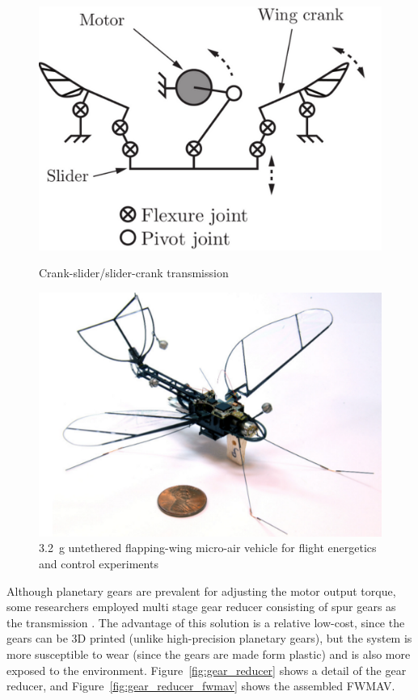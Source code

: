 \begin{figure}
\centering
{}
\includegraphics[width=\textwidth]{Files/Figures/crank-slider.png}
\caption[Crank-slider/slider-crank transmission]{Crank-slider/slider-crank transmission \cite{Rosen2016} }
\label{fig:crank-slider}
\endminipage\hfill
{}
\includegraphics[width=\textwidth]{Files/Figures/locust.png}
\caption[Locust size FWMAV]{3.2~g untethered flapping-wing micro-air vehicle for flight energetics and control experiments \cite{Rosen2016}}
\label{fig:locust}
\endminipage\hfill
\end{figure}

Although planetary gears are prevalent for adjusting the motor output torque, some researchers employed multi stage gear reducer consisting of spur gears as the transmission \cite{Phan2015}. The advantage of this solution is a relative low-cost, since the gears can be 3D printed (unlike high-precision planetary gears), but the system is more susceptible to wear (since the gears are made form plastic) and is also more exposed to the environment. Figure~\ref{fig:gear_reducer} shows a detail of the gear reducer, and Figure~\ref{fig:gear_reducer_fwmav} shows the assembled FWMAV.

